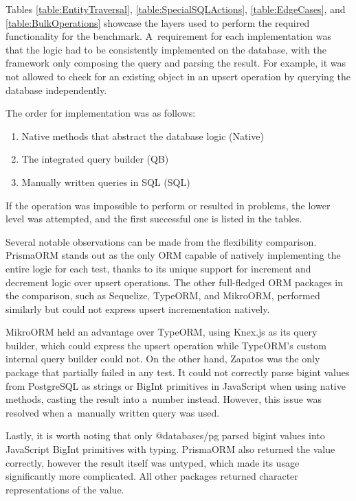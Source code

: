 Tables \ref{table:EntityTraversal}, \ref{table:SpecialSQLActions},
\ref{table:EdgeCases}, and \ref{table:BulkOperations} showcase the layers used
to perform the required functionality for the benchmark. A~requirement for each
implementation was that the logic had to be consistently implemented on the
database, with the framework only composing the query and parsing the result.
For example, it was not allowed to check for an existing object in an upsert
operation by querying the database independently.

The order for implementation was as follows:
\begin{enumerate}
  \item Native methods that abstract the database logic (Native)
  \item The integrated query builder (QB)
  \item Manually written queries in SQL (SQL)
\end{enumerate}
If the operation was impossible to perform or resulted in problems, the lower
level was attempted, and the first successful one is listed in the tables.

Several notable observations can be made from the flexibility comparison.
PrismaORM stands out as the only ORM capable of natively implementing the entire
logic for each test, thanks to its unique support for increment and decrement
logic over upsert operations. The other full-fledged ORM packages in the
comparison, such as Sequelize, TypeORM, and MikroORM, performed similarly but
could not express upsert incrementation natively.

MikroORM held an advantage over TypeORM, using Knex.js as its query builder,
which could express the upsert operation while TypeORM's custom internal query
builder could not. On the other hand, Zapatos was the only package that
partially failed in any test. It could not correctly parse bigint values from
PostgreSQL as strings or BigInt primitives in JavaScript when using native
methods, casting the result into a~number instead. However, this issue was
resolved when a~manually written query was used.

Lastly, it is worth noting that only @databases/pg parsed bigint values into
JavaScript BigInt primitives with typing. PrismaORM also returned the value
correctly, however the result itself was untyped, which made its usage
significantly more complicated. All other packages returned character
representations of the value. 


